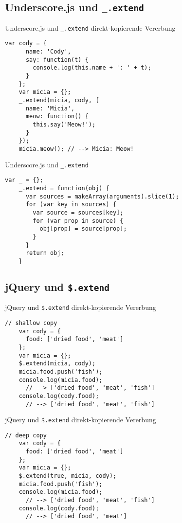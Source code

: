 \subsection{Underscore.js und \texttt{\_.extend}}

\begin{frame}[fragile]{Underscore.js und \texttt{\_.extend}}
    {direkt-kopierende Vererbung}
  \begin{lstlisting}[basicstyle=\ttfamily,gobble=4]
    var cody = {
      name: 'Cody',
      say: function(t) {
        console.log(this.name + ': ' + t);
      }
    };
    var micia = {};
    _.extend(micia, cody, {
      name: 'Micia',
      meow: function() {
        this.say('Meow!');
      }
    });
    micia.meow(); // --> Micia: Meow!
  \end{lstlisting}
\end{frame}

\begin{frame}[fragile]{Underscore.js und \texttt{\_.extend}}
  \begin{lstlisting}[basicstyle=\ttfamily,gobble=4]
    var _ = {};
    _.extend = function(obj) {
      var sources = makeArray(arguments).slice(1);
      for (var key in sources) {
        var source = sources[key];
        for (var prop in source) {
          obj[prop] = source[prop];
        }
      }
      return obj;
    }
  \end{lstlisting}
\end{frame}

\subsection{jQuery und \texttt{\$.extend}}

\begin{frame}[fragile]{jQuery und \texttt{\$.extend}}
    {direkt-kopierende Vererbung}
  \begin{lstlisting}[basicstyle=\ttfamily,gobble=4]
    // shallow copy
    var cody = {
      food: ['dried food', 'meat']
    };
    var micia = {};
    $.extend(micia, cody);
    micia.food.push('fish');
    console.log(micia.food);
      // --> ['dried food', 'meat', 'fish']
    console.log(cody.food);
      // --> ['dried food', 'meat', 'fish']
  \end{lstlisting}
\end{frame}

\begin{frame}[fragile]{jQuery und \texttt{\$.extend}}
    {direkt-kopierende Vererbung}
  \begin{lstlisting}[basicstyle=\ttfamily,gobble=4]
    // deep copy
    var cody = {
      food: ['dried food', 'meat']
    };
    var micia = {};
    $.extend(true, micia, cody);
    micia.food.push('fish');
    console.log(micia.food);
      // --> ['dried food', 'meat', 'fish']
    console.log(cody.food);
      // --> ['dried food', 'meat']
  \end{lstlisting}
\end{frame}

